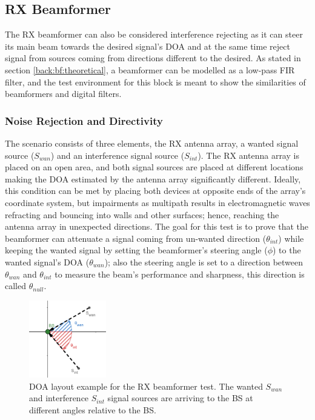 \documentclass[12pt,a4paper]{report}
\begin{document}
\subsection{RX Beamformer} \label{test:bf:rx}
The RX beamformer can also be considered interference rejecting as it can steer its main beam towards the desired signal's DOA and at the same time reject signal from sources coming from directions different to the desired. As stated in section \ref{back:bf:theoretical}, a beamformer can be modelled as a low-pass FIR filter, and the test environment for this block is meant to show the similarities of beamformers and digital filters. 

\subsubsection{Noise Rejection and Directivity} \label{test:bf:rx:noise}
The scenario consists of three elements, the RX antenna array, a wanted signal source ($S_{wan}$) and an interference signal source ($S_{int}$). The RX antenna array is placed on an open area, and both signal sources are placed at different locations making the DOA estimated by the antenna array significantly different. Ideally, this condition can be met by placing both devices at opposite ends of the array's coordinate system, but impairments as multipath results in electromagnetic waves refracting and bouncing into walls and other surfaces; hence, reaching the antenna array in unexpected directions. The goal for this test is to prove that the beamformer can attenuate a signal coming from un-wanted direction ($\theta_{int}$) while keeping the wanted signal by setting the beamformer's steering angle ($\phi$) to the wanted signal's DOA ($\theta_{wan}$); also the steering angle is set to a direction between $\theta_{wan}$ and $\theta_{int}$ to measure the beam's performance and sharpness, this direction is called $\theta_{null}$. 

\begin{figure}[h]
    \centering
    \includegraphics[width = 0.3\textwidth]{Figures/test_bf_rx.png}
    \caption[Example layout for the RX beamformer test.]{DOA layout example for the RX beamformer test. The wanted $S_{wan}$ and interference $S_{int}$ signal sources are arriving to the BS at different angles relative to the BS.}
    \label{fig:test:bf:rx}
\end{figure}
\end{document}
